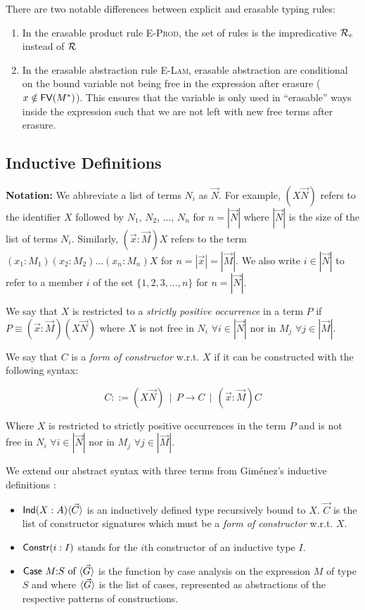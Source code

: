 \documentclass[10pt]{article}
\begin{document}
There are two notable differences between explicit and erasable typing rules:
\begin{enumerate}
\item In the erasable product rule \textsc{E-Prod}, the set of rules is the impredicative $\mathcal{R}_e$ instead of $\mathcal{R}$
\item In the erasable abstraction rule \textsc{E-Lam}, erasable abstraction are conditional on the bound variable not being free in the expression after erasure ($x \notin \textsf{FV}(M^*)$). This ensures that the variable is only used in ``erasable'' ways inside the expression such that we are not left with new free terms after erasure.
\end{enumerate}

\subsection{Inductive Definitions}
\textbf{Notation:} We abbreviate a list of terms $N_i$ as $\vec{N}$. For example, $(X \vec{N})$ refers to the identifier $X$ followed by $N_1$, $N_2$, ...,  $N_n$ for $n = |\vec{N}|$ where $|\vec{N}|$ is the size of the list of terms $N_i$. Similarly, $(\vec{x}:\vec{M})X$ refers to the term $(x_1:M_1)(x_2:M_2)...(x_n:M_n)X$ for $n = |\vec{x}| = |\vec{M}|$. We also write $i \in |\vec{N}|$ to refer to a member $i$ of the set $\{1,2,3,...,n\}$ for $n = |\vec{N}|$.
\\
\begin{definition}
  We say that $X$ is restricted to a \emph{strictly positive occurrence} in a term $P$ if $P \equiv (\vec{x}:\vec{M})(X \vec{N})$ where $X$ is not free in $N_i$ $\forall i \in |\vec{N}|$ nor in $M_j$ $\forall j \in |\vec{M}|$.
\end{definition}
\begin{definition}
  \label{def:foc}
  We say that $C$ is a \emph{form of constructor} w.r.t. $X$ if it can be constructed with the following syntax:

  $$C ::= (X \vec{N}) ~~|~~ P\to C ~~|~~  (\vec{x}:\vec{M})C$$

  Where $X$ is restricted to strictly positive occurrences in the term $P$ and is not free in $N_i$ $\forall i \in |\vec{N}|$ nor in $M_j$ $\forall j \in |\vec{M}|$.
\end{definition}
We extend our abstract syntax with three terms from Gim\'enez's inductive definitions \cite{gimenez}:
\begin{itemize}
  \renewcommand{\labelitemi}{$-$}
  \setlength\itemsep{-3pt}
\item $\textsf{Ind}(X:A) \langle\vec{C}\rangle$ is an inductively defined type recursively bound to $X$. $\vec{C}$ is the list of constructor signatures which must be a \emph{form of constructor} w.r.t. $X$.
\item $\textsf{Constr}(i:I)$ stands for the $i$th constructor of an inductive type $I$.
\item $\textsf{Case}\ M\hspace{-3pt}:\hspace{-3pt} S \text{ of } \langle\vec{G}\rangle$ is the function by case analysis on the expression $M$ of type $S$ and where $\langle\vec{G}\rangle$ is the list of cases, represented as abstractions of the respective patterns of constructions.
\end{itemize}
\end{document}
